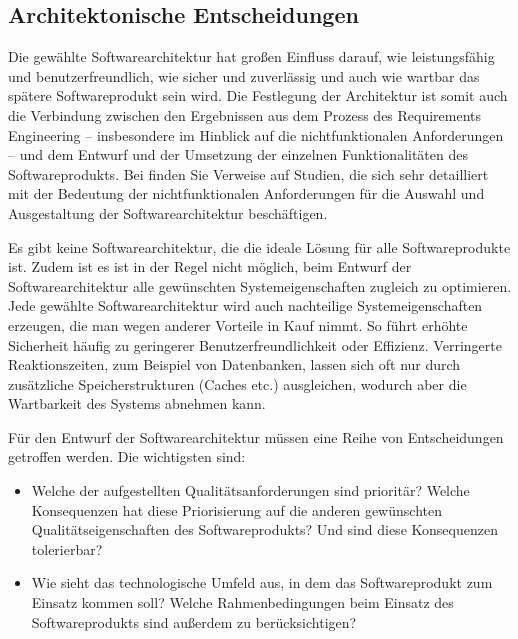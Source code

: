 \subsection{Architektonische Entscheidungen}
\label{sec:Kap-7.1.1}

Die gewählte Softwarearchitektur hat großen Einfluss darauf, wie leistungsfähig und benutzerfreundlich, wie sicher und zuverlässig und auch wie wartbar das spätere Softwareprodukt sein wird. Die Festlegung der Architektur ist somit auch die Verbindung zwischen den Ergebnissen aus dem Prozess des Requirements Engineering – insbesondere im Hinblick auf die nichtfunktionalen Anforderungen – und dem Entwurf und der Umsetzung der einzelnen Funktionalitäten des Softwareprodukts. Bei \cite[194]{som18} finden Sie Verweise auf Studien, die sich sehr detailliert mit der Bedeutung der nichtfunktionalen Anforderungen für die Auswahl und Ausgestaltung der Softwarearchitektur beschäftigen.

Es gibt keine Softwarearchitektur, die die ideale Lösung für alle Softwareprodukte ist. Zudem ist es ist in der Regel nicht möglich, beim Entwurf der Software\-architektur alle gewünschten Systemeigenschaften zugleich zu optimieren. Jede gewählte Software\-architektur wird auch nachteilige Systemeigenschaften erzeugen, die man wegen anderer Vorteile in Kauf nimmt. So führt erhöhte Sicherheit häufig zu geringerer Benutzerfreundlichkeit oder Effizienz. Verringerte Reaktionszeiten, zum Beispiel von Datenbanken, lassen sich oft nur durch zusätzliche Speicherstrukturen (Caches etc.) ausgleichen, wodurch aber die Wartbarkeit des Systems abnehmen kann. 

Für den Entwurf der Softwarearchitektur müssen eine Reihe von Entscheidungen getroffen werden. Die wichtigsten sind:

\begin{itemize}
	\item Welche der aufgestellten Qualitätsanforderungen sind prioritär? Welche Konsequenzen hat diese Priorisierung auf die anderen gewünschten Qualitäts\-eigenschaften des Softwareprodukts? Und sind diese Konsequenzen tolerierbar?
	\item Wie sieht das technologische Umfeld aus, in dem das Softwareprodukt zum Einsatz kommen soll? Welche Rahmenbedingungen beim Einsatz des Software\-produkts sind außerdem zu berücksichtigen?
\end{itemize}

\vspace{\baselineskip} %

